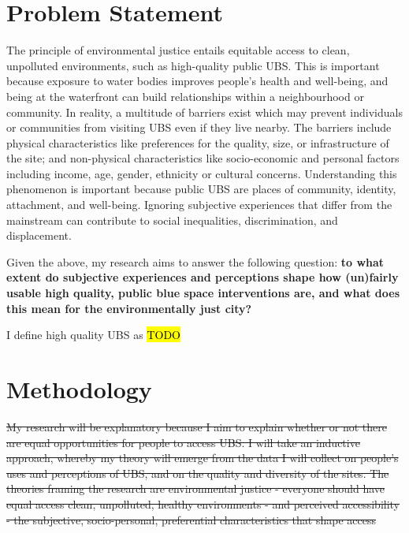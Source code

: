 \documentclass{article}
\begin{document}
\section{Problem Statement}

The principle of environmental justice entails equitable access to clean, unpolluted environments, such as high-quality public UBS. This is important because exposure to water bodies improves people's health and well-being, and being at the waterfront can build relationships within a neighbourhood or community.
In reality, a multitude of barriers exist which may prevent individuals or communities from visiting UBS even if they live nearby. The barriers include physical characteristics like preferences for the quality, size, or infrastructure of the site; and non-physical characteristics like socio-economic and personal factors including income, age, gender, ethnicity or cultural concerns.
Understanding this phenomenon is important because public UBS are places of community, identity, attachment, and well-being. Ignoring subjective experiences that differ from the mainstream can contribute to social inequalities, discrimination, and displacement.

Given the above, my research aims to answer the following question: \textbf{to what extent do subjective experiences and perceptions shape how (un)fairly usable high quality, public blue space interventions are, and what does this mean for the environmentally just city?}

I define high quality UBS as \hl{TODO}

\section{Methodology}

\sout{My research will be explanatory because I aim to explain whether or not there are equal opportunities for people to access UBS. I will take an inductive approach, whereby my theory will emerge from the data I will collect on people’s uses and perceptions of UBS, and on the quality and diversity of the sites. The theories framing the research are environmental justice - everyone should have equal access clean, unpolluted, healthy environments - and perceived accessibility - the subjective, socio-personal, preferential characteristics that shape access}
\end{document}

